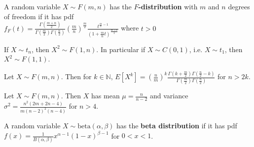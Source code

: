 \begin{defn}
    A random variable $X \sim F(m,n)$ has the \textbf{$F$-distribution} with $m$ and $n$ degrees of freedom if it has pdf \\ 
    $ f_F(t) = \displaystyle \frac{\Gamma\left(\frac{m + n}{2} \right)}{\Gamma\left(\frac{m}{2} \right) \Gamma\left(\frac{n}{2} \right)} \displaystyle \left(\frac{m}{n}\right)^{\frac{m}{2}} \frac{t^{\frac{m}{2} - 1}}{(1 + \frac{m}{n}t)^{\frac{m + n}{2}}} $ where $t > 0$
\end{defn}

\begin{prop}
    If $X \sim t_n$, then $X^2 \sim F(1,n)$. In particular if $X \sim C(0,1)$, i.e. $X \sim t_1$, then $X^2 \sim F(1,1)$.
\end{prop}

\begin{prop}
    Let $X \sim F(m,n)$. Then for $k \in \mathbb{N}$, $E[X^k] =\displaystyle \left(\frac{n}{m}\right)^k \frac{\Gamma(k + \frac{m}{2}) \Gamma(\frac{n}{2} - k)}{\Gamma(\frac{m}{2}) \Gamma(\frac{n}{2})}$ for $n > 2k$.
\end{prop}

\begin{prop}
    Let $X \sim F(m,n)$. Then $X$ has mean $\mu = \displaystyle \frac{n}{n-2}$ and variance $\sigma^2 = \displaystyle \frac{n^2 (2m + 2n - 4)}{m (n-2)^2 (n-4)}$ for $n > 4$.
\end{prop}

\begin{defn}
    A random variable $X \sim \text{beta}(\alpha, \beta)$ has the \textbf{beta distribution} if it has pdf \\
    $ f(x) = \displaystyle \frac{1}{B(\alpha, \beta)} x^{\alpha-1} (1-x)^{\beta - 1}$ for $0 < x < 1$.
\end{defn}
